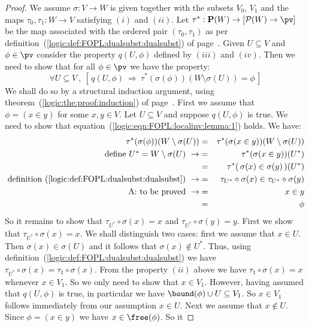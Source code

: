 \begin{proof}
We assume $\sigma:V\to W$ is given together with the subsets
$V_{0}$, $V_{1}$ and the maps $\tau_{0},\tau_{1}:W\to V$ satisfying
$(i)$ and $(ii)$. Let $\tau^{*}:{\bf P}(W)\to[{\cal P}(W)\to\pv]$ be
the map associated with the ordered pair $(\tau_{0},\tau_{1})$ as
per definition~(\ref{logic:def:FOPL:dualsubst:dualsubst}) of
page~\pageref{logic:def:FOPL:dualsubst:dualsubst}. Given $U\subseteq
V$ and $\phi\in\pv$ consider the property $q(U,\phi)$ defined by
$(iii)$ and $(iv)$. Then we need to show that for all $\phi\in\pv$
we have the property:
    \[
    \forall U\subseteq V\ ,\ [\,q(U,\phi)\ \Rightarrow\
    \tau^{*}(\sigma(\phi))(W\setminus\sigma(U))=\phi\,]
    \]
We shall do so by a structural induction argument, using
theorem~(\ref{logic:the:proof:induction}) of
page~\pageref{logic:the:proof:induction}. First we assume that
$\phi=(x\in y)$ for some $x, y\in V$. Let $U\subseteq V$ and suppose
$q(U,\phi)$ is true. We need to show that
equation~(\ref{logic:eqn:FOPL:localinv:lemma:1}) holds. We have:
    \begin{eqnarray*}
    \tau^{*}(\sigma(\phi))(W\setminus\sigma(U))&=&
    \tau^{*}(\sigma(x\in y))(W\setminus\sigma(U))\\
    \mbox{define $U^{*}=W\setminus\sigma(U)$}\ \rightarrow
    &=&\tau^{*}(\sigma(x\in y))(U^{*})\\
    &=&\tau^{*}(\,\sigma(x)\in \sigma(y)\,)(U^{*})\\
    \mbox{definition~(\ref{logic:def:FOPL:dualsubst:dualsubst})}\
    \rightarrow
    &=&\tau_{U^{*}}\circ\sigma(x)\in \tau_{U^{*}}\circ\sigma(y)\\
    \mbox{A: to be proved}\ \rightarrow&=&x\in y\\
    &=&\phi
    \end{eqnarray*}
So it remains to show that $\tau_{U^{*}}\circ\sigma(x)=x$ and
$\tau_{U^{*}}\circ\sigma(y)=y$. First we show that
$\tau_{U^{*}}\circ\sigma(x)=x$. We shall distinguish two cases:
first we assume that $x\in U$. Then $\sigma(x)\in\sigma(U)$ and it
follows that $\sigma(x)\not\in U^{*}$. Thus, using
definition~(\ref{logic:def:FOPL:dualsubst:dualsubst}) we have
$\tau_{U^{*}}\circ\sigma(x)=\tau_{1}\circ\sigma(x)$. From the
property $(ii)$ above we have $\tau_{1}\circ\sigma(x)=x$ whenever
$x\in V_{1}$. So we only need to show that $x\in V_{1}$. However,
having assumed that $q(U,\phi)$ is true, in particular we have
$\bound(\phi)\cup U\subseteq V_{1}$. So $x\in V_{1}$ follows
immediately from our assumption $x\in U$. Next we assume that
$x\not\in U$. Since $\phi=(x\in y)$ we have $x\in\free(\phi)$. So it

\end{proof}
